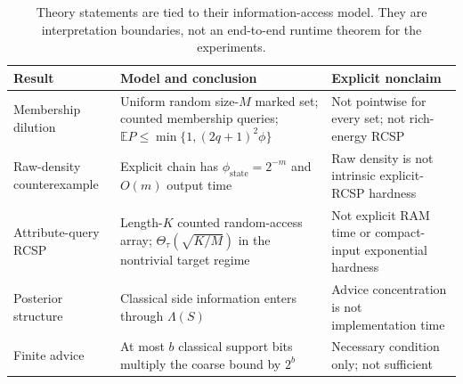 
\begin{table}[t]
\centering
\caption{Theory statements are tied to their information-access model. They are interpretation boundaries, not an end-to-end runtime theorem for the experiments.}
\label{tab:theory-scope}
\small
\begin{tabularx}{\textwidth}{@{}lXX@{}}
\toprule
Result & Model and conclusion & Explicit nonclaim \\
\midrule
Membership dilution & Uniform random size-$M$ marked set; counted membership queries; $\mathbb{E}P\leq\min\{1,(2q+1)^2\phi\}$ & Not pointwise for every set; not rich-energy RCSP \\
Raw-density counterexample & Explicit chain has $\phi_{\mathrm{state}}=2^{-m}$ and $O(m)$ output time & Raw density is not intrinsic explicit-RCSP hardness \\
Attribute-query RCSP & Length-$K$ counted random-access array; $\Theta_{\tau}(\sqrt{K/M})$ in the nontrivial target regime & Not explicit RAM time or compact-input exponential hardness \\
Posterior structure & Classical side information enters through $\Lambda(S)$ & Advice concentration is not implementation time \\
Finite advice & At most $b$ classical support bits multiply the coarse bound by $2^b$ & Necessary condition only; not sufficient \\
\bottomrule
\end{tabularx}
\end{table}
